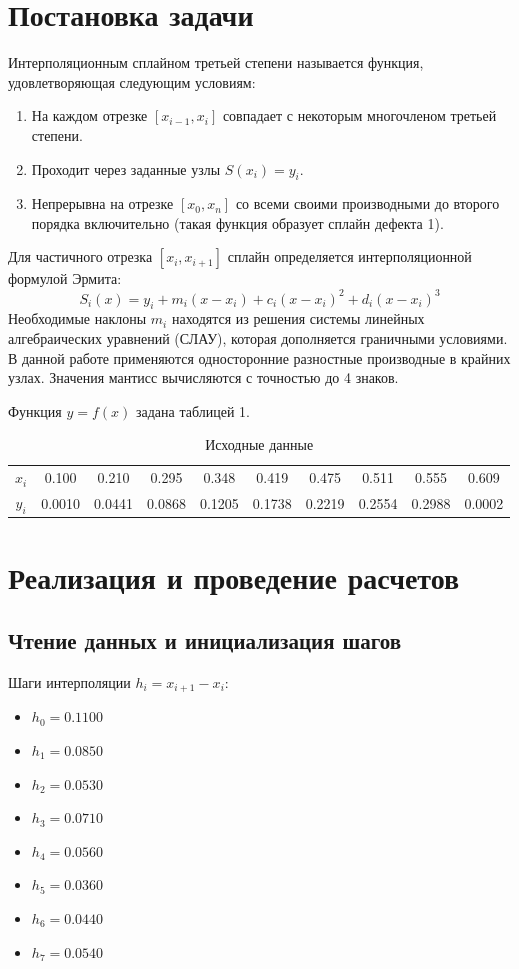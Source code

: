 
\section{Постановка задачи}
Интерполяционным сплайном третьей степени называется функция, удовлетворяющая следующим условиям:
\begin{enumerate}
    \item На каждом отрезке $[x_{i-1}, x_i]$ совпадает с некоторым многочленом третьей степени.
    \item Проходит через заданные узлы $S(x_i) = y_i$.
    \item Непрерывна на отрезке $[x_0, x_n]$ со всеми своими производными до второго порядка включительно (такая функция образует сплайн дефекта 1).
\end{enumerate}

Для частичного отрезка $[x_i, x_{i+1}]$ сплайн определяется интерполяционной формулой Эрмита:
\[
S_i(x) = y_i + m_i(x - x_i) + c_i(x - x_i)^2 + d_i(x - x_i)^3
\]
Необходимые наклоны $m_i$ находятся из решения системы линейных алгебраических уравнений (СЛАУ), которая дополняется граничными условиями. В данной работе применяются односторонние разностные производные в крайних узлах. Значения мантисс вычисляются с точностью до 4 знаков.

Функция $y = f(x)$ задана таблицей 1.
\begin{table}[h]
\centering
\begin{tabular}{|c|ccccccccc|}
\hline
$x_i$ & 0.100 & 0.210 & 0.295 & 0.348 & 0.419 & 0.475 & 0.511 & 0.555 & 0.609 \\
$y_i$ & 0.0010 & 0.0441 & 0.0868 & 0.1205 & 0.1738 & 0.2219 & 0.2554 & 0.2988 & 0.0002 \\
\hline
\end{tabular}
\caption{Исходные данные}
\end{table}

\section{Реализация и проведение расчетов}
\subsection{Чтение данных и инициализация шагов}
Шаги интерполяции $h_i = x_{i+1} - x_i$:
\begin{itemize}
    \item $h_0 = 0.1100$
    \item $h_1 = 0.0850$
    \item $h_2 = 0.0530$
    \item $h_3 = 0.0710$
    \item $h_4 = 0.0560$
    \item $h_5 = 0.0360$
    \item $h_6 = 0.0440$
    \item $h_7 = 0.0540$
\end{itemize}


